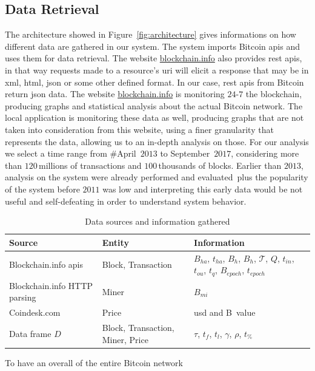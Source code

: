 \documentclass[USenglish]{uit-thesis}
\def\bitcoin{\leavevmode\rlap{\hskip.5pt-}B}
\begin{document}
\subsection{Data Retrieval}
\label{sec:dataretrieval}
The architecture showed in Figure~\ref{fig:architecture}
gives informations on how different data are
gathered in our system.
The system imports Bitcoin \gls{api}s and uses
them for data retrieval. The website \url{blockchain.info}
also provides \gls{rest} \gls{api}s, in that way
requests made to a resource's \gls{uri}
will elicit a response that may be in \gls{xml}, \gls{html}, \gls{json}
or some other defined format. In our case, \gls{rest} \gls{api}s
from Bitcoin return \gls{json} data.
The website \url{blockchain.info} is monitoring $24$-$7$ the blockchain,
producing graphs and
statistical analysis about the
actual Bitcoin network. The local
application is monitoring these data as well,
producing graphs that are not taken into
consideration from this website,
using a finer granularity that represents
the data, allowing us to an in-depth analysis
on those.
For our analysis we select a time range from \#April~$2013$ to
September~$2017$, considering more than $120$\,millions of transactions
and $100$\,thousands of blocks. Earlier than $2013$, analysis
on the system were already performed and
evaluated\,\cite{croman2016, houy2014EOBTF,
	Moser2015, Rizun:2015:blocksizelimit}
plus the popularity of the system before
$2011$ was low and interpreting this early data would
be not useful and self-defeating in order
to understand system behavior.
\begin{table}
	\centering
		\caption{Data sources and information gathered}
		\label{tab:datasources}
	\begin{tabular}{|p{3cm}p{3cm}p{4cm}|} \hline
			\textbf{Source}&\textbf{Entity}& \textbf{Information}\\
			\hline
			Blockchain.info \gls{api}s&Block, Transaction&$B_{ha}$, $t_{ha}$, $B_h$, $B_h$, $\mathcal{T}$, $Q$, $t_{in}$, $t_{ou}$, $t_q$, $B_{epoch}$, $t_{epoch}$\\
			\hline
			Blockchain.info HTTP parsing&Miner& $B_{mi}$\\
			\hline
			Coindesk.com&Price&\gls{usd} and \bitcoin~value\\
			\hline
			Data frame $D$&Block, Transaction, Miner, Price&$\tau$, $t_f$, $t_l$, $\gamma$, $\rho$, $t_\%$\\
			\hline
		\end{tabular}
\end{table}
To have an overall of the entire Bitcoin network
\end{document}

